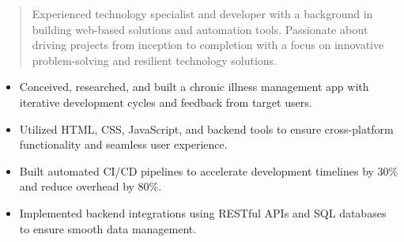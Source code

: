 \begin{quote}
  \noindent
  Experienced technology specialist and developer with a background in building web-based solutions and automation tools. Passionate about driving projects from inception to completion with a focus on innovative problem-solving and resilient technology solutions.
\end{quote}

\par\smallskip
\noindent
\begin{minipage}{20cm}
  \begin{minipage}{9.75cm}
    \begin{itemize}
      \item Conceived, researched, and built a chronic illness management app with iterative development cycles and feedback from target users.
      \item Utilized HTML, CSS, JavaScript, and backend tools to ensure cross-platform functionality and seamless user experience.
    \end{itemize}
  \end{minipage}
  \hfill
  \begin{minipage}{9.75cm}
    \begin{itemize}
      \item Built automated CI/CD pipelines to accelerate development timelines by 30\% and reduce overhead by 80\%.
      \item Implemented backend integrations using RESTful APIs and SQL databases to ensure smooth data management.
    \end{itemize}
  \end{minipage}
\end{minipage}
\par\smallskip
\divider


